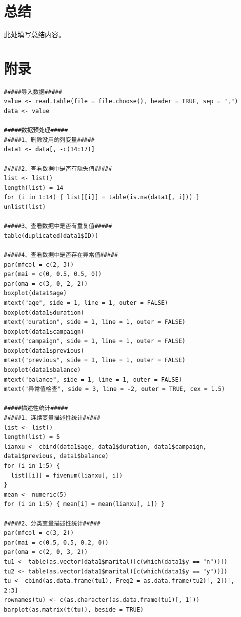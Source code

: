 \documentclass[12pt,a4paper,UTF8]{ctexart}
\begin{document}
\section{总结}
此处填写总结内容。


\clearpage
\section*{附录}
\begin{lstlisting}
#####导入数据#####
value <- read.table(file = file.choose(), header = TRUE, sep = ",")
data <- value

#####数据预处理#####
#####1、删除没用的列变量#####
data1 <- data[, -c(14:17)]

#####2、查看数据中是否有缺失值#####
list <- list()
length(list) = 14
for (i in 1:14) { list[[i]] = table(is.na(data1[, i])) }
unlist(list)

#####3、查看数据中是否有重复值#####
table(duplicated(data1$ID))

#####4、查看数据中是否存在异常值#####
par(mfcol = c(2, 3))
par(mai = c(0, 0.5, 0.5, 0))
par(oma = c(3, 0, 2, 2))
boxplot(data1$age)
mtext("age", side = 1, line = 1, outer = FALSE)
boxplot(data1$duration)
mtext("duration", side = 1, line = 1, outer = FALSE)
boxplot(data1$campaign)
mtext("campaign", side = 1, line = 1, outer = FALSE)
boxplot(data1$previous)
mtext("previous", side = 1, line = 1, outer = FALSE)
boxplot(data1$balance)
mtext("balance", side = 1, line = 1, outer = FALSE)
mtext("异常值检查", side = 3, line = -2, outer = TRUE, cex = 1.5)

#####描述性统计#####
#####1、连续变量描述性统计#####
list <- list()
length(list) = 5
lianxu <- cbind(data1$age, data1$duration, data1$campaign, data1$previous, data1$balance)
for (i in 1:5) {
  list[[i]] = fivenum(lianxu[, i])
}
mean <- numeric(5)
for (i in 1:5) { mean[i] = mean(lianxu[, i]) }

#####2、分类变量描述性统计#####
par(mfcol = c(3, 2))
par(mai = c(0.5, 0.5, 0.2, 0))
par(oma = c(2, 0, 3, 2))
tu1 <- table(as.vector(data1$marital)[c(which(data1$y == "n"))])
tu2 <- table(as.vector(data1$marital)[c(which(data1$y == "y"))])
tu <- cbind(as.data.frame(tu1), Freq2 = as.data.frame(tu2)[, 2])[, 2:3]
rownames(tu) <- c(as.character(as.data.frame(tu1)[, 1]))
barplot(as.matrix(t(tu)), beside = TRUE)
\end{lstlisting}
\end{document}
